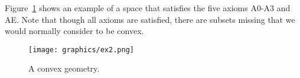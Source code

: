 \documentclass[11pt,a4paper]{llncs}
\newcounter{ax}
\begin{document}
Figure~\ref{ex2} shows an example of a space that satisfies the five axioms A0-A3 and AE. Note that though all axioms are satisfied, there are subsets missing that we would normally consider to be convex. %

\begin{figure}
\begin{center}
\texttt{[image: graphics/ex2.png]}
\caption{A convex geometry.}\label{ex2}
\end{center}
\end{figure}

%

\nocite{*} %



\end{document}
